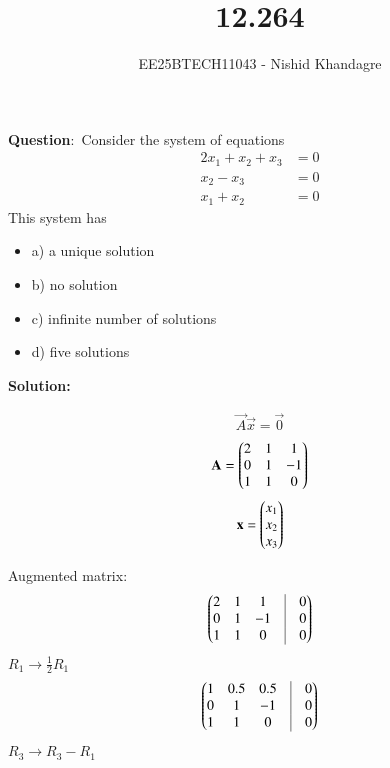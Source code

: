 \documentclass[journal]{IEEEtran}
\title{12.264}
\author{EE25BTECH11043 - Nishid Khandagre} %
\begin{document}
\maketitle

\renewcommand{\thefigure}{\theenumi}
\renewcommand{\thetable}{\theenumi}


\textbf{Question}:\
Consider the system of equations
\begin{align*}
2x_1 + x_2 + x_3 &= 0 \\
x_2 - x_3 &= 0 \\
x_1 + x_2 &= 0
\end{align*}
This system has
\begin{itemize}
\item a) a unique solution
\item b) no solution
\item c) infinite number of solutions
\item d) five solutions
\end{itemize}

\textbf{Solution: }

    \begin{align}
    \vec{A}\vec{x} = \vec{0}
    \end{align}
    \begin{align}
    \mathbf{A} =\begin{pmatrix}
    2 & 1 & 1 \\
    0 & 1 & -1 \\
    1 & 1 & 0
    \end{pmatrix}
    \end{align}
    \begin{align}
    \mathbf{x} =
    \begin{pmatrix}
    x_1 \\ x_2 \\ x_3
    \end{pmatrix}
    \end{align}
    
Augmented matrix:
\begin{align}
    \myvec{
    2 & 1 & 1 & \vrule & 0 \\
    0 & 1 & -1 & \vrule & 0 \\
    1 & 1 & 0 & \vrule & 0
   }
\end{align}
    $R_1 \rightarrow \frac{1}{2}R_1$
    \begin{align}
    \myvec{
    1 & 0.5 & 0.5 & \vrule & 0 \\
    0 & 1 & -1 & \vrule & 0 \\
    1 & 1 & 0 & \vrule & 0
    }
    \end{align}
    $R_3 \rightarrow R_3 - R_1$
    
\end{document}
